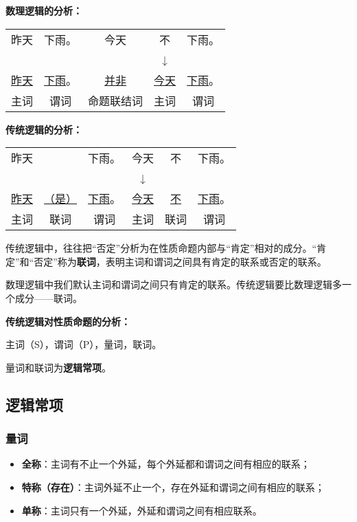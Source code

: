 \documentclass[12pt,onecolumn,a4paper]{book}
\numberwithin{table}{subsection}
\numberwithin{equation}{subsection}
\begin{document}
\textbf{数理逻辑的分析：}

\begin{tabular}{ccccc}
    昨天&下雨。&今天&不&下雨。\\
    &&&↓&\\
    \underline{昨天}&\underline{下雨}。&\underline{并非}&\underline{今天}&\underline{下雨}。\\
    主词&谓词&命题联结词&主词&谓词\\
\end{tabular}

\textbf{传统逻辑的分析：}

\begin{tabular}{cccccc}
    昨天&&下雨。&今天&不&下雨。\\
    &&&↓&\\
    \underline{昨天}&\underline{（是）}&\underline{下雨}。&\underline{今天}&\underline{不}&\underline{下雨}。\\
    主词&联词&谓词&主词&联词&谓词\\
\end{tabular}

传统逻辑中，往往把“否定”分析为在性质命题内部与“肯定”相对的成分。“肯定”和“否定”称为\textbf{联词}，表明主词和谓词之间具有肯定的联系或否定的联系。

数理逻辑中我们默认主词和谓词之间只有肯定的联系。传统逻辑要比数理逻辑多一个成分——联词。

\textbf{传统逻辑对性质命题的分析：}

主词（S），谓词（P），量词，联词。

量词和联词为\textbf{逻辑常项}。

\subsection{逻辑常项}

\subsubsection{量词}

\begin{itemize}[itemsep=0pt,parsep=0pt]
    \item \textbf{全称}：主词有不止一个外延，每个外延都和谓词之间有相应的联系；
    \item \textbf{特称（存在）}：主词外延不止一个，存在外延和谓词之间有相应的联系；
    \item \textbf{单称}：主词只有一个外延，外延和谓词之间有相应联系。
\end{itemize}
\end{document}
